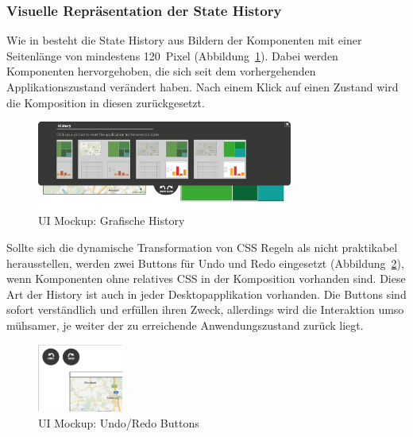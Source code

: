 \documentclass[
	headsepline,
	footsepline,
	fontsize=12pt,
	bibliography=totoc
]{scrbook}
\begin{document}
\subsubsection{Visuelle Repräsentation der State History}


Wie in \cite{Heer2008} besteht die State History aus Bildern der Komponenten mit einer Seitenlänge von mindestens 120~Pixel (Abbildung~\ref{figure:undo-graphical}). Dabei werden Komponenten hervorgehoben, die sich seit dem vorhergehenden Applikationszustand verändert haben. Nach einem Klick auf einen Zustand wird die Komposition in diesen zurückgesetzt.

\begin{figure}[htbp]
   \centering
   \includegraphics[width=0.75\textwidth]{images/konzeption-undo-graphical.png}
   \caption{UI Mockup: Grafische History}
   \label{figure:undo-graphical}
\end{figure}


Sollte sich die dynamische Transformation von CSS Regeln als nicht praktikabel herausstellen, werden zwei Buttons für Undo und Redo eingesetzt (Abbildung~\ref{figure:undo-simple}), wenn Komponenten ohne relatives CSS in der Komposition vorhanden sind. Diese Art der History ist auch in jeder Desktopapplikation vorhanden. Die Buttons sind sofort verständlich und erfüllen ihren Zweck, allerdings wird die Interaktion umso mühsamer, je weiter der zu erreichende Anwendungszustand zurück liegt.

\begin{figure}[htbp]
   \centering
   \includegraphics[width=0.25\textwidth]{images/konzeption-undo-simple.png}
   \caption{UI Mockup: Undo/Redo Buttons}
   \label{figure:undo-simple}
\end{figure}
\end{document}
